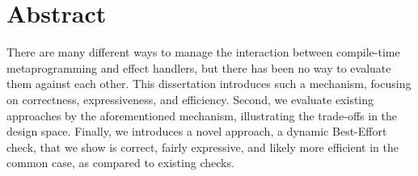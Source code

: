 \chapter*{Abstract}
There are many different ways to manage the interaction between compile-time metaprogramming and effect handlers, but there has been no way to evaluate them against each other. This dissertation introduces such a mechanism, focusing on correctness, expressiveness, and efficiency. Second, we evaluate existing approaches by the aforementioned mechanism, illustrating the trade-offs in the design space. Finally, we introduces a novel approach, a dynamic Best-Effort check, that we show is correct, fairly expressive, and likely more efficient in the common case, as compared to existing checks. 